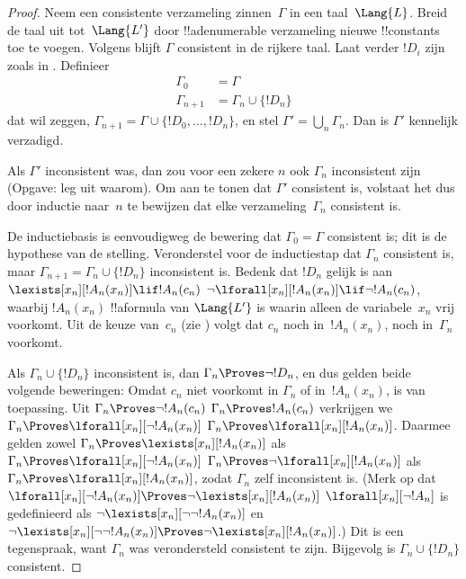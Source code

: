 \documentclass[openany]{memoir}
\begin{document}
\begin{proof}
Neem een consistente verzameling zinnen~$\Gamma$ in een taal~$\Lang{L}$.
Breid de taal uit tot~$\Lang{L'}$ door !!a{denumerable} verzameling
nieuwe !!{constant}s toe te voegen. Volgens  blijft
$\Gamma$ consistent in de rijkere taal. Laat verder $!D_i$ zijn zoals
in . Definieer
\begin{align*}
\Gamma_0 & = \Gamma \\
\Gamma_{n+1} & = \Gamma_n \cup \{!D_n \}
\end{align*}
dat wil zeggen, $\Gamma_{n+1} = \Gamma \cup \{ !D_0, \dots, !D_n \}$,
en stel $\Gamma' = \bigcup_{n} \Gamma_n$. Dan is $\Gamma'$ kennelijk
verzadigd.

Als $\Gamma'$ inconsistent was, dan zou voor een zekere $n$ ook
$\Gamma_n$ inconsistent zijn (Opgave: leg uit waarom). Om aan te tonen
dat $\Gamma'$ consistent is, volstaat het dus door inductie naar~$n$ te
bewijzen dat elke verzameling~$\Gamma_n$ consistent is.

De inductiebasis is eenvoudigweg de bewering dat $\Gamma_0 = \Gamma$
consistent is; dit is de hypothese van de stelling. Veronderstel voor de
inductiestap dat $\Gamma_{n}$ consistent is, maar $\Gamma_{n+1} =
\Gamma_n \cup \{!D_n\}$ inconsistent is. Bedenk dat $!D_n$ gelijk is aan
{$\lexists[x_{n}][!A_{n}(x_n)] \lif !A_{n}(c_{n})$}
{$\lnot\lforall[x_{n}][!A_{n}(x_n)] \lif \lnot !A_{n}(c_{n})$},
waarbij $!A_n(x_n)$ !!a{formula} van $\Lang{L'}$ is waarin alleen de
variabele~$x_n$ vrij voorkomt. Uit de keuze van~$c_n$ (zie
) volgt dat $c_n$ noch in~$!A_n(x_n)$, noch
in~$\Gamma_n$ voorkomt.

Als $\Gamma_n \cup \{!D_n\}$ inconsistent is, dan $\Gamma_n
\Proves \lnot !D_n$, en dus gelden beide volgende beweringen:
Omdat $c_n$ niet voorkomt in
$\Gamma_n$ of in~$!A_n(x_n)$, is
van toepassing. Uit 
{$\Gamma_n \Proves \lnot !A_n(c_n)$}
{$\Gamma_n \Proves !A_n(c_n)$}
verkrijgen we
{$\Gamma_n \Proves \lforall[x_n][\lnot !A_n(x_n)]$}
{$\Gamma_n \Proves \lforall[x_n][!A_n(x_n)]$}.
Daarmee gelden zowel
{$\Gamma_n \Proves \lexists[x_n][!A_n(x_n)]$ als
$\Gamma_n \Proves \lforall[x_n][\lnot !A_n(x_n)]$}
{$\Gamma_n \Proves \lnot\lforall[x_n][!A_n(x_n)]$ als
$\Gamma_n \Proves \lforall[x_n][!A_n(x_n)]$},
zodat $\Gamma_n$ zelf inconsistent is.
{(Merk op dat
{$\lforall[x_n][\lnot !A_n(x_n)] \Proves
  \lnot\lexists[x_n][!A_n(x_n)]$}
{$\lforall[x_n][\lnot !A_n]$ is gedefinieerd als
  $\lnot\lexists[x_n][\lnot\lnot !A_n(x_n)]$ en
  $\lnot\lexists[x_n][\lnot\lnot !A_n(x_n)] \Proves
  \lnot\lexists[x_n][!A_n(x_n)]$}.)}{}
Dit is een tegenspraak, want $\Gamma_n$ was verondersteld consistent te
zijn. Bijgevolg is $\Gamma_n \cup \{ !D_n\}$ consistent.
\end{proof}
\end{document}
